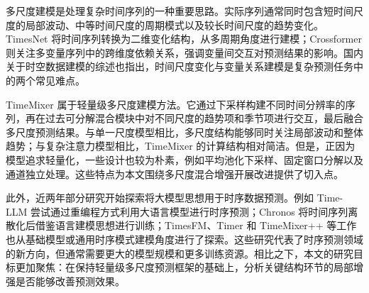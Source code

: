 多尺度建模是处理复杂时间序列的一种重要思路。实际序列通常同时包含短时间尺度的局部波动、中等时间尺度的周期模式以及较长时间尺度的趋势变化。TimesNet\cite{wu2023timesnet} 将时间序列转换为二维变化结构，从多周期角度进行建模；Crossformer\cite{zhang2023crossformer} 则关注多变量序列中的跨维度依赖关系，强调变量间交互对预测结果的影响。国内关于时空数据建模的综述也指出，时间尺度变化与变量关系建模是复杂预测任务中的两个常见难点\cite{li2019spatiotemporal}。

TimeMixer\cite{wang2023timemixer} 属于轻量级多尺度建模方法。它通过下采样构建不同时间分辨率的序列，再在过去可分解混合模块中对不同尺度的趋势项和季节项进行交互，最后融合多尺度预测结果。与单一尺度模型相比，多尺度结构能够同时关注局部波动和整体趋势；与复杂注意力模型相比，TimeMixer 的计算结构相对简洁。但是，正因为模型追求轻量化，一些设计也较为朴素，例如平均池化下采样、固定窗口分解以及通道独立处理。这些特点为本文围绕多尺度混合增强开展改进提供了切入点。

此外，近两年部分研究开始探索将大模型思想用于时序数据预测。例如 Time-LLM\cite{jin2023timellm} 尝试通过重编程方式利用大语言模型进行时序预测；Chronos\cite{ansari2024chronos} 将时间序列离散化后借鉴语言建模思想进行训练；TimesFM\cite{das2024timesfm}、Timer\cite{liu2024timer} 和 TimeMixer++\cite{wang2024timemixerpp} 等工作也从基础模型或通用时序模式建模角度进行了探索。这些研究代表了时序预测领域的新方向，但通常需要更大的模型规模和更多训练资源。相比之下，本文的研究目标更加聚焦：在保持轻量级多尺度预测框架的基础上，分析关键结构环节的局部增强是否能够改善预测效果。

\begin{table}[htbp]
    \centering
    \caption{时序预测方法研究现状归纳}
    \label{tab:related_summary}
\end{table}

